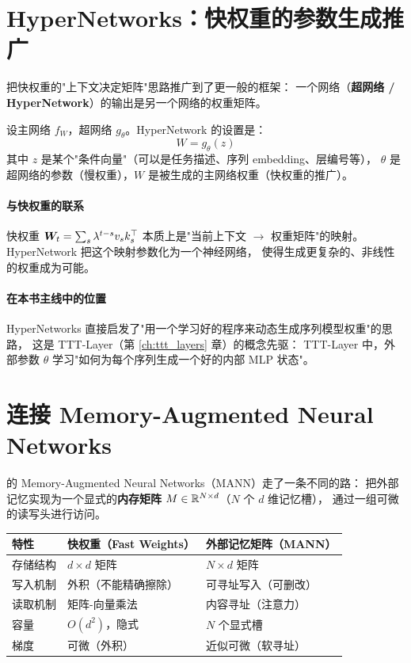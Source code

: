 \section{HyperNetworks：快权重的参数生成推广}
\label{sec:hypernetworks}

\citet{ha2016hypernetworks} 把快权重的"上下文决定矩阵"思路推广到了更一般的框架：
一个网络（\textbf{超网络 / HyperNetwork}）的输出是另一个网络的权重矩阵。

\begin{definition}[HyperNetwork]
设主网络 $f_W$，超网络 $g_\theta$。HyperNetwork 的设置是：
\[
  W = g_\theta(z)
\]
其中 $z$ 是某个"条件向量"（可以是任务描述、序列 embedding、层编号等），
$\theta$ 是超网络的参数（慢权重），$W$ 是被生成的主网络权重（快权重的推广）。
\end{definition}

\paragraph{与快权重的联系}
快权重 $\boldsymbol{W}_t = \sum_s \lambda^{t-s} v_s k_s^\top$ 本质上是"当前上下文 $\to$ 权重矩阵"的映射。
HyperNetwork 把这个映射参数化为一个神经网络，
使得生成更复杂的、非线性的权重成为可能。

\paragraph{在本书主线中的位置}
HyperNetworks 直接启发了"用一个学习好的程序来动态生成序列模型权重"的思路，
这是 TTT-Layer（第 \ref{ch:ttt_layers} 章）的概念先驱：
TTT-Layer 中，外部参数 $\theta$ 学习"如何为每个序列生成一个好的内部 MLP 状态"。

\section{连接 Memory-Augmented Neural Networks}
\label{sec:mann}

\citet{santoro2016mann} 的 Memory-Augmented Neural Networks（MANN）走了一条不同的路：
把外部记忆实现为一个显式的\textbf{内存矩阵} $M \in \mathbb{R}^{N \times d}$（$N$ 个 $d$ 维记忆槽），
通过一组可微的读写头进行访问。

\begin{center}
\begin{tabular}{lll}
\toprule
特性 & 快权重（Fast Weights） & 外部记忆矩阵（MANN） \\
\midrule
存储结构 & $d \times d$ 矩阵 & $N \times d$ 矩阵 \\
写入机制 & 外积（不能精确擦除） & 可寻址写入（可删改） \\
读取机制 & 矩阵-向量乘法 & 内容寻址（注意力） \\
容量 & $O(d^2)$，隐式 & $N$ 个显式槽 \\
梯度 & 可微（外积） & 近似可微（软寻址） \\
\bottomrule
\end{tabular}
\end{center}


